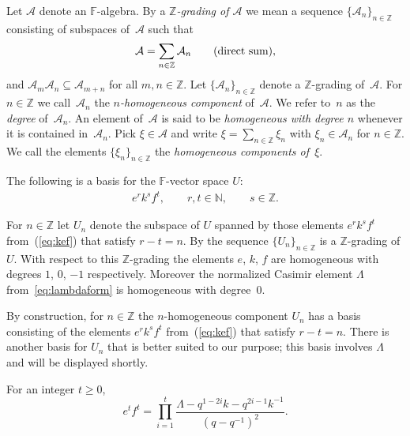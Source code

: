 Let $\mathcal A$ denote an
$\mathbb F$-algebra.
By a {\it $\mathbb Z$-grading of $\mathcal A$} we mean a sequence
 $\lbrace {\mathcal A}_n \rbrace_{n\in \mathbb Z}$ consisting of
 subspaces of~$\mathcal A$
 such
that
\begin{gather*}
{\mathcal A} = \sum_{n\in \mathbb Z} \mathcal A_n
\qquad
{\mbox {\rm {(direct sum)}}},
\end{gather*}
and $\mathcal A_m \mathcal A_n \subseteq \mathcal A_{m+n}$
for all $m,n \in \mathbb Z$. Let
$\lbrace {\mathcal A}_n \rbrace_{n\in \mathbb Z}$ denote
a $\mathbb Z$-grading of~$\mathcal A$.
For $n \in \mathbb Z$
we call~$\mathcal A_n$ the {\it $n$-homogeneous component} of~$\mathcal A$.
We refer to~$n$ as the {\it degree}
of~$\mathcal A_n$.
An element of~$\mathcal A$ is
said to be {\it homogeneous with degree $n$} whenever
it is contained in~$\mathcal A_n$. Pick $\xi \in \mathcal A$
and write
$\xi = \sum\limits_{n \in \mathbb Z} \xi_n$ with
$\xi_n \in \mathcal A_n$ for $n \in \mathbb Z$.
We call the elements $\lbrace \xi_n\rbrace_{n\in \mathbb Z}$
the {\it homogeneous components of~$\xi$}.




\begin{Lemma}
\label{lem:efkbasis}
The following is a basis for the $\mathbb F$-vector space
$U$:
\begin{gather}
e^r k^s f^t, \qquad   r,t\in \mathbb N, \qquad  s \in \mathbb Z.
\label{eq:kef}
\end{gather}
\end{Lemma}


For $n \in \mathbb Z$ let $U_n$ denote the subspace of
$U$  spanned
by those elements
$e^r k^s f^t$ from~(\ref{eq:kef}) that satisfy
$r-t=n$.
By \cite[Section~1.9]{jantzen} the sequence
$\lbrace U_n\rbrace_{n\in \mathbb Z}$ is a $\mathbb Z$-grading
of
$U$.
With respect to this $\mathbb Z$-grading the elements
$e$, $k$, $f$ are homogeneous with degrees
$1$, $0$, $-1$ respectively. Moreover the normalized
Casimir element $\Lambda$ from~\eqref{eq:lambdaform}
is homogeneous with degree~0.


By construction,
for $n \in \mathbb Z$ the $n$-homogeneous component
$U_n$ has a basis consisting of the elements
$e^r k^s f^t$ from~(\ref{eq:kef}) that satisfy
$r-t=n$. There is another basis for
$U_n$ that is better suited to our purpose;
this basis involves $\Lambda $ and
 will be displayed shortly.


\begin{Lemma}
\label{lem:ident}
For an integer $t\geq 0$,
\[
e^t f^t = \prod_{i=1}^t \frac{\Lambda -q^{1-2i}k-q^{2i-1}k^{-1}}{(q-q^{-1})^2}.
\]
\end{Lemma}

